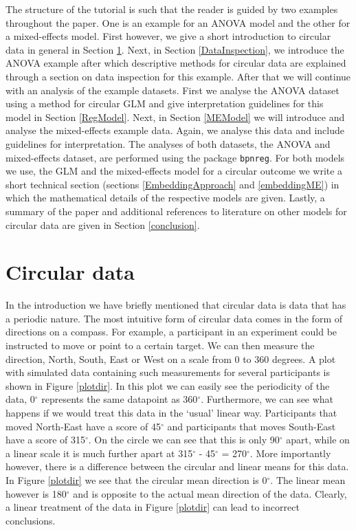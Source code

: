 \documentclass[11pt,]{article}
\begin{document}
The structure of the tutorial is such that the reader is guided by two
examples throughout the paper. One is an example for an ANOVA model and
the other for a mixed-effects model. First however, we give a short
introduction to circular data in general in Section \ref{circdat}. Next,
in Section \ref{DataInspection}, we introduce the ANOVA example after
which descriptive methods for circular data are explained through a
section on data inspection for this example. After that we will continue
with an analysis of the example datasets. First we analyse the ANOVA
dataset using a method for circular GLM and give interpretation
guidelines for this model in Section \ref{RegModel}. Next, in Section
\ref{MEModel} we will introduce and analyse the mixed-effects example
data. Again, we analyse this data and include guidelines for
interpretation. The analyses of both datasets, the ANOVA and
mixed-effects dataset, are performed using the package \verb|bpnreg|.
For both models we use, the GLM and the mixed-effects model for a
circular outcome we write a short technical section (sections
\ref{EmbeddingApproach} and \ref{embeddingME}) in which the mathematical
details of the respective models are given. Lastly, a summary of the
paper and additional references to literature on other models for
circular data are given in Section \ref{conclusion}.

\section{Circular data}\label{circdat}

In the introduction we have briefly mentioned that circular data is data
that has a periodic nature. The most intuitive form of circular data
comes in the form of directions on a compass. For example, a participant
in an experiment could be instructed to move or point to a certain
target. We can then measure the direction, North, South, East or West on
a scale from 0 to 360 degrees. A plot with simulated data containing
such measurements for several participants is shown in Figure
\ref{plotdir}. In this plot we can easily see the periodicity of the
data, 0\(^\circ\) represents the same datapoint as 360\(^\circ\).
Furthermore, we can see what happens if we would treat this data in the
`usual' linear way. Participants that moved North-East have a score of
45\(^\circ\) and participants that moves South-East have a score of
315\(^\circ\). On the circle we can see that this is only 90\(^\circ\)
apart, while on a linear scale it is much further apart at 315\(^\circ\)
- 45\(^\circ\) = 270\(^\circ\). More importantly however, there is a
difference between the circular and linear means for this data. In
Figure \ref{plotdir} we see that the circular mean direction is
0\(^\circ\). The linear mean however is 180\(^\circ\) and is opposite to
the actual mean direction of the data. Clearly, a linear treatment of
the data in Figure \ref{plotdir} can lead to incorrect conclusions.
\end{document}
